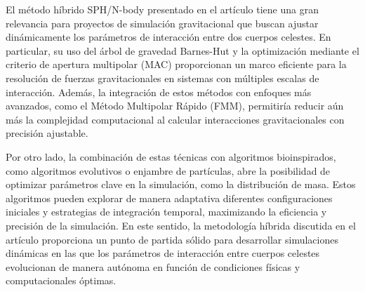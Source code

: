 El método híbrido SPH/N-body presentado en el artículo tiene una gran relevancia para proyectos de simulación gravitacional que buscan ajustar dinámicamente los parámetros de interacción entre dos cuerpos celestes. En particular, su uso del árbol de gravedad Barnes-Hut y la optimización mediante el criterio de apertura multipolar (MAC) proporcionan un marco eficiente para la resolución de fuerzas gravitacionales en sistemas con múltiples escalas de interacción. Además, la integración de estos métodos con enfoques más avanzados, como el Método Multipolar Rápido (FMM), permitiría reducir aún más la complejidad computacional al calcular interacciones gravitacionales con precisión ajustable.

Por otro lado, la combinación de estas técnicas con algoritmos bioinspirados, como algoritmos evolutivos o enjambre de partículas, abre la posibilidad de optimizar parámetros clave en la simulación, como la distribución de masa. Estos algoritmos pueden explorar de manera adaptativa diferentes configuraciones iniciales y estrategias de integración temporal, maximizando la eficiencia y precisión de la simulación. En este sentido, la metodología híbrida discutida en el artículo proporciona un punto de partida sólido para desarrollar simulaciones dinámicas en las que los parámetros de interacción entre cuerpos celestes evolucionan de manera autónoma en función de condiciones físicas y computacionales óptimas.


